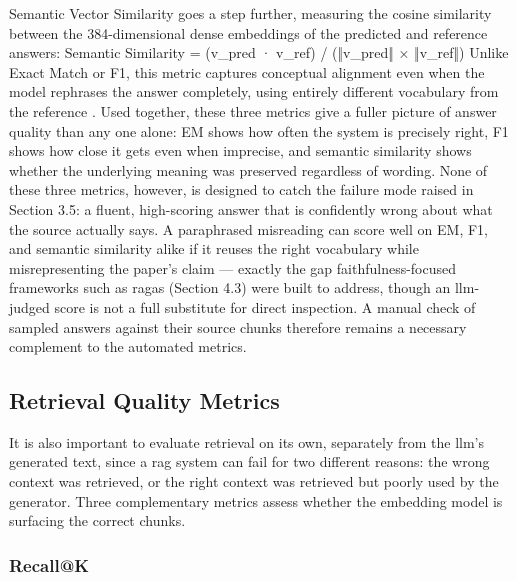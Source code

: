 
Semantic Vector Similarity goes a step further, measuring the cosine similarity between the 384-dimensional dense embeddings of the predicted and reference answers:
\newline \newline Semantic Similarity = (v_pred · v_ref) / (‖v_pred‖ × ‖v_ref‖)
\newline \newline Unlike Exact Match or F1, this metric captures conceptual alignment even when the model rephrases the answer completely, using entirely different vocabulary from the reference \citep{zhang2020bertscore}. Used together, these three metrics give a fuller picture of answer quality than any one alone: EM shows how often the system is precisely right, F1 shows how close it gets even when imprecise, and semantic similarity shows whether the underlying meaning was preserved regardless of wording.
\newline \newline None of these three metrics, however, is designed to catch the failure mode raised in Section 3.5: a fluent, high-scoring answer that is confidently wrong about what the source actually says. A paraphrased misreading can score well on EM, F1, and semantic similarity alike if it reuses the right vocabulary while misrepresenting the paper's claim — exactly the gap faithfulness-focused frameworks such as \gls{ragas} (Section 4.3) were built to address, though an \gls{llm}-judged score is not a full substitute for direct inspection. A manual check of sampled answers against their source chunks therefore remains a necessary complement to the automated metrics.

\subsection{Retrieval Quality Metrics}

It is also important to evaluate retrieval on its own, separately from the \gls{llm}'s generated text, since a \gls{rag} system can fail for two different reasons: the wrong context was retrieved, or the right context was retrieved but poorly used by the generator. Three complementary metrics assess whether the embedding model is surfacing the correct chunks.

\subsubsection{Recall@K}

